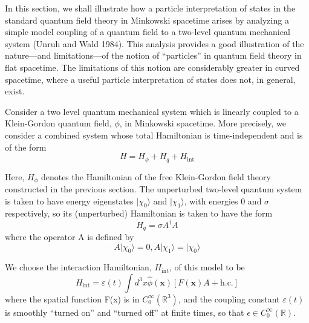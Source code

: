 \documentclass[11pt,a4paper]{article}
\begin{document}
In this section, we shall illustrate how a particle interpretation of states in the standard quantum field theory in Minkowski spacetime arises by analyzing a simple model coupling of a quantum field to a two-level quantum mechanical system (Unruh and Wald 1984). This analysis provides a good illustration of the nature---and limitations---of the notion of ``particles'' in quantum field theory in flat spacetime. The limitations of this notion are considerably greater in curved spacetime, where a useful particle interpretation of states does not, in general, exist.

Consider a two level quantum mechanical system which is linearly coupled to a Klein-Gordon quantum field, \(\phi\), in Minkowski spacetime. More precisely, we consider a combined system whose total Hamiltonian is time-independent and is of the form
\begin{equation*}
H = H_{\phi} + H_{q} + H_{\mathrm{int}} \tag{3.3.1}\label{eq:3.3.1}
\end{equation*}

Here, \(H_{\phi}\) denotes the Hamiltonian of the free Klein-Gordon field theory constructed in the previous section. The unperturbed two-level quantum system is taken to have energy eigenstates \(\lvert \chi_0\rangle\) and \(\lvert \chi_1\rangle\), with energies 0 and \(\sigma\) respectively, so its (unperturbed) Hamiltonian is taken to have the form
\begin{equation*}
H_{q} = \sigma A^{\dagger} A \tag{3.3.2}\label{eq:3.3.2}
\end{equation*}
where the operator A is defined by
\begin{equation*}
A\lvert \chi_0\rangle =0, A\lvert \chi_1\rangle =\lvert \chi_0\rangle \tag{3.3.3}\label{eq:3.3.3}
\end{equation*}

We choose the interaction Hamiltonian, \(H_{\mathrm{int}}\), of this model to be
\begin{equation*}
H_{\mathrm{int}} = \varepsilon(t) \int d^3x \hat{\phi}(\mathbf{x}) [ F(\mathbf{x}) A + \mathrm{h.c.} ] \tag{3.3.4}\label{eq:3.3.4}
\end{equation*}
where the spatial function F(x) is in \(C_0^{\infty}(\mathbb{R}^3)\), and the coupling constant\hypertarget{source-61}{} \(\varepsilon(t)\) is smoothly ``turned on'' and ``turned off'' at finite times, so that \(\epsilon \in C_0^\infty(\mathbb{R})\).
\end{document}
